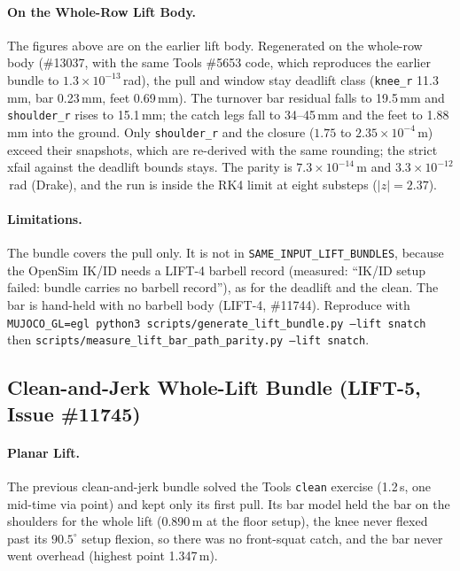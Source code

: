 \documentclass[11pt,a4paper]{article}
\begin{document}
\paragraph{On the Whole-Row Lift Body.} The figures above are on the earlier
lift body. Regenerated on the whole-row body (\#13037, with the same
Tools \#5653 code, which reproduces the earlier bundle to
$1.3\times10^{-13}$\,rad), the pull and window stay deadlift class
(\texttt{knee\_r} 11.3\,mm, bar 0.23\,mm, feet 0.69\,mm). The turnover bar
residual falls to 19.5\,mm and \texttt{shoulder\_r} rises to 15.1\,mm; the
catch legs fall to 34--45\,mm and the feet to 1.88\,mm into the ground. Only
\texttt{shoulder\_r} and the closure ($1.75$ to $2.35\times10^{-4}$\,m)
exceed their snapshots, which are re-derived with the same rounding; the
strict xfail against the deadlift bounds stays. The parity is
$7.3\times10^{-14}$\,m and $3.3\times10^{-12}$\,rad (Drake), and the run is
inside the RK4 limit at eight substeps ($|z|=2.37$).

\paragraph{Limitations.} The bundle covers the pull only. It is not in
\texttt{SAME\_INPUT\_LIFT\_BUNDLES}, because the OpenSim IK/ID needs a LIFT-4
barbell record (measured: ``IK/ID setup failed: bundle carries no barbell
record''), as for the deadlift and the clean. The bar is hand-held with no
barbell body (LIFT-4, \#11744). Reproduce with
\texttt{MUJOCO\_GL=egl python3 scripts/generate\_lift\_bundle.py --lift snatch}
then \texttt{scripts/measure\_lift\_bar\_path\_parity.py --lift snatch}.

\subsection{Clean-and-Jerk Whole-Lift Bundle (LIFT-5, Issue \#11745)}
\paragraph{Planar Lift.} The previous clean-and-jerk bundle solved the Tools
\texttt{clean} exercise (1.2\,s, one mid-time via point) and kept only its
first pull. Its bar model held the bar on the shoulders for the whole lift
(0.890\,m at the floor setup), the knee never flexed past its $90.5^\circ$
setup flexion, so there was no front-squat catch, and the bar never went
overhead (highest point 1.347\,m).
\end{document}
